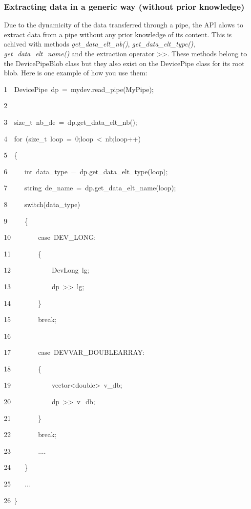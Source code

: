 \subsubsection{Extracting data in a generic way (without prior knowledge)}

Due to the dynamicity of the data transferred through a pipe, the
API alows to extract data from a pipe without any prior knowledge
of its content. This is achived with methods \emph{get\_data\_elt\_nb()},
\emph{get\_data\_elt\_type()}, \emph{get\_data\_elt\_name()} and the
extraction operator \textquotedbl{}>\textcompwordmark{}>\textquotedbl{}.
These methods belong to the DevicePipeBlob class but they also exist
on the DevicePipe class for its root blob. Here is one example of
how you use them:


\begin{lyxcode}
1~~DevicePipe~dp~=~mydev.read\_pipe(\textquotedbl{}MyPipe\textquotedbl{});

2

3~~size\_t~nb\_de~=~dp.get\_data\_elt\_nb();~~

4~~for~(size\_t~loop~=~0;loop~<~nb;loop++)

5~~\{~~~~~~

6~~~~~int~data\_type~=~dp.get\_data\_elt\_type(loop);~~~~~~

7~~~~~string~de\_name~=~dp.get\_data\_elt\_name(loop);~~~~~~

8~~~~~switch(data\_type)~~~~~~

9~~~~~\{~~~~~~~~~

10~~~~~~~~case~DEV\_LONG:~~~~~~~~~

11~~~~~~~~\{~~~~~~~~~~~~~

12~~~~~~~~~~~~DevLong~lg;~~~~~~~~~~~~~

13~~~~~~~~~~~~dp~>\textcompwordmark{}>~lg;~~~~~~~~~

14~~~~~~~~\}~~~~~~~~~

15~~~~~~~~break;

16~~~~~~~~

17~~~~~~~~case~DEVVAR\_DOUBLEARRAY:~~~~~~~~~

18~~~~~~~~\{~~~~~~~~~~~~~

19~~~~~~~~~~~~vector<double>~v\_db;~~~~~~~~~~~~~

20~~~~~~~~~~~~dp~>\textcompwordmark{}>~v\_db;~~~~~~~~~

21~~~~~~~~\}~~~~~~~~~

22~~~~~~~~break;~~~~~~~~~

23~~~~~~~~....~~~~~~

24~~~~\}~~

25~~~~...~~

26~\}
\end{lyxcode}



